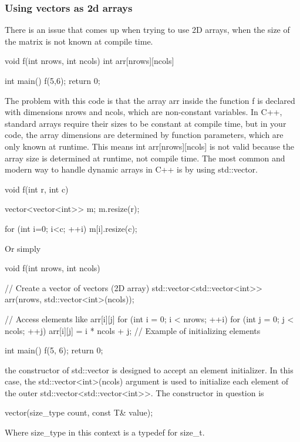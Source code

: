 \documentclass{report}
\begin{document}
    \subsubsection{Using vectors as 2d arrays}
    \bigbreak \noindent 
    There is an issue that comes up when trying to use 2D arrays, when the size of the matrix is not known at compile time.
    \bigbreak \noindent 
    \begin{cppcode}
        void f(int nrows, int ncols) {
            int arr[nrows][ncols]
        }

        int main() {
            f(5,6);
            return 0;
        }
    \end{cppcode}
    \bigbreak \noindent 
    The problem with this code is that the array arr inside the function f is declared with dimensions nrows and ncols, which are non-constant variables. In C++, standard arrays require their sizes to be constant at compile time, but in your code, the array dimensions are determined by function parameters, which are only known at runtime.
    \bigbreak \noindent 
    This means int arr[nrows][ncols] is not valid because the array size is determined at runtime, not compile time.
    \pagebreak \bigbreak \noindent 
    The most common and modern way to handle dynamic arrays in C++ is by using std::vector.
    \bigbreak \noindent 
    \begin{cppcode}
        void f(int r, int c) {
            vector<vector<int>> m;
            m.resize(r);

            for (int i=0; i<c; ++i) {
                m[i].resize(c);
            }
        }
    \end{cppcode}
    \bigbreak \noindent 
    Or simply
    \bigbreak \noindent 
    \begin{cppcode}
        void f(int nrows, int ncols) {
            // Create a vector of vectors (2D array)
            std::vector<std::vector<int>> arr(nrows, std::vector<int>(ncols));

            // Access elements like arr[i][j]
            for (int i = 0; i < nrows; ++i) {
                for (int j = 0; j < ncols; ++j) {
                    arr[i][j] = i * ncols + j;  // Example of initializing elements
                }
            }
        }

        int main() {
            f(5, 6);
            return 0;
        }
    \end{cppcode}
    \bigbreak \noindent 
    the constructor of std::vector is designed to accept an element initializer. In this case, the std::vector<int>(ncols) argument is used to initialize each element of the outer std::vector<std::vector<int>>. The constructor in question is 
    \bigbreak \noindent 
    \begin{cppcode}
        vector(size_type count, const T& value);
    \end{cppcode}
    \bigbreak \noindent 
    Where size\_type in this context is a typedef for size\_t.
\end{document}
